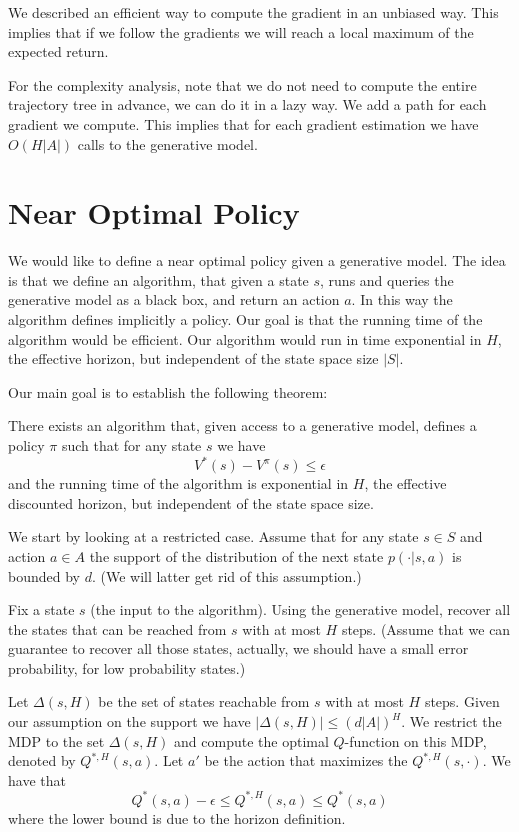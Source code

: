 We described an efficient way to compute the gradient in an unbiased
way. This implies that if we follow the gradients we will reach a
local maximum of the expected return.

For the complexity analysis, note that we do not need to compute the
entire trajectory tree in advance, we can do it in a lazy way. We
add a path for each gradient we compute. This implies that for each
gradient estimation we have $O(H|A|)$ calls to the generative model.

\section{Near Optimal Policy}

We would like to define a near optimal policy given a generative
model. The idea is that we define an algorithm, that given a state
$s$, runs and queries the generative model as a black box, and
return an action $a$. In this way the algorithm defines implicitly a
policy. Our goal is that the running time of the algorithm would be
efficient. Our algorithm would run in time exponential in $H$, the
effective horizon, but independent of the state space size $|S|$.

Our main goal is to establish the following theorem:

\begin{theorem}
There exists an algorithm that,  given access to a generative model,
defines a policy $\pi$ such that for any state $s$ we have
\[
V^*(s)-V^\pi(s)\leq \epsilon
\]
and the running time of the algorithm is exponential in $H$, the
effective discounted horizon, but independent of the state space
size.
\end{theorem}

We start by looking at a restricted case. Assume that for any state
$s\in S$ and action $a\in A$ the support of the distribution of the
next state $p(\cdot|s,a)$ is bounded by $d$. (We will latter get rid
of this assumption.)

Fix a state $s$ (the input to the algorithm). Using the generative
model, recover all the states that can be reached from $s$ with at
most $H$ steps. (Assume that we can guarantee to recover all those
states, actually, we should have a small error probability, for low
probability states.)

Let $\Delta(s,H)$ be the set of states reachable from $s$ with at
most $H$ steps. Given our assumption on the support we have
$|\Delta(s,H)|\leq (d|A|)^H $. We restrict the MDP to the set
$\Delta(s,H)$ and compute the optimal $Q$-function on this MDP,
denoted by $Q^{*,H}(s,a)$. Let $a'$ be the action that maximizes the
$Q^{*,H}(s,\cdot)$. We have that
\[
Q^*(s,a)-\epsilon \leq Q^{*,H}(s,a)\leq Q^*(s,a)
\]
where the lower bound is due to the horizon definition.

